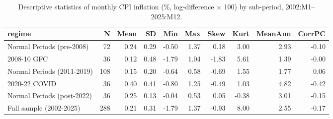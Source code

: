 \begin{table}[ht]
\centering
\begin{tabular}{lrrrrrrrrr}
  \toprule
regime & N & Mean & SD & Min & Max & Skew & Kurt & MeanAnn & CorrPC \\ 
  \midrule
Normal Periods (pre-2008) &  72 & 0.24 & 0.29 & -0.50 & 1.37 & 0.18 & 3.00 & 2.93 & -0.10 \\ 
  2008-10 GFC &  36 & 0.12 & 0.48 & -1.79 & 1.04 & -1.83 & 5.61 & 1.39 & -0.00 \\ 
  Normal Periods (2011-2019) & 108 & 0.15 & 0.20 & -0.64 & 0.58 & -0.69 & 1.55 & 1.77 & 0.06 \\ 
  2020-22 COVID &  36 & 0.40 & 0.41 & -0.80 & 1.25 & -0.49 & 1.03 & 4.82 & -0.42 \\ 
  Normal Periods (post-2022) &  36 & 0.25 & 0.13 & -0.04 & 0.53 & 0.05 & -0.38 & 3.01 & -0.15 \\ 
  Full sample (2002-2025) & 288 & 0.21 & 0.31 & -1.79 & 1.37 & -0.93 & 8.00 & 2.55 & -0.17 \\ 
   \bottomrule
\end{tabular}
\caption{Descriptive statistics of monthly CPI inflation (\%, log-difference \(\times\) 100) by sub-period, 2002:M1--2025:M12.} 
\label{tab:desc_regime}
\end{table}
